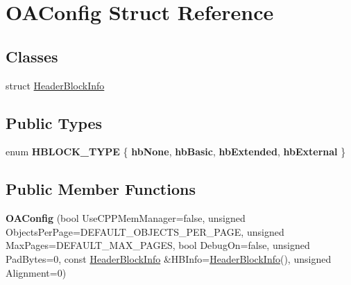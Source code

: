 \hypertarget{structOAConfig}{\section{O\-A\-Config Struct Reference}
\label{structOAConfig}
}
\subsection*{Classes}
\begin{DoxyCompactItemize}
\item 
struct \hyperlink{structOAConfig_1_1HeaderBlockInfo}{Header\-Block\-Info}
\end{DoxyCompactItemize}
\subsection*{Public Types}
\begin{DoxyCompactItemize}
\item 
enum {\bfseries H\-B\-L\-O\-C\-K\-\_\-\-T\-Y\-P\-E} \{ {\bfseries hb\-None}, 
{\bfseries hb\-Basic}, 
{\bfseries hb\-Extended}, 
{\bfseries hb\-External}
 \}
\end{DoxyCompactItemize}
\subsection*{Public Member Functions}
\begin{DoxyCompactItemize}
\item 
\hypertarget{structOAConfig_a036df6b3c5cefef38274637926155397}{{\bfseries O\-A\-Config} (bool Use\-C\-P\-P\-Mem\-Manager=false, unsigned Objects\-Per\-Page=D\-E\-F\-A\-U\-L\-T\-\_\-\-O\-B\-J\-E\-C\-T\-S\-\_\-\-P\-E\-R\-\_\-\-P\-A\-G\-E, unsigned Max\-Pages=D\-E\-F\-A\-U\-L\-T\-\_\-\-M\-A\-X\-\_\-\-P\-A\-G\-E\-S, bool Debug\-On=false, unsigned Pad\-Bytes=0, const \hyperlink{structOAConfig_1_1HeaderBlockInfo}{Header\-Block\-Info} \&H\-B\-Info=\hyperlink{structOAConfig_1_1HeaderBlockInfo}{Header\-Block\-Info}(), unsigned Alignment=0)}\label{structOAConfig_a036df6b3c5cefef38274637926155397}

\end{DoxyCompactItemize}
